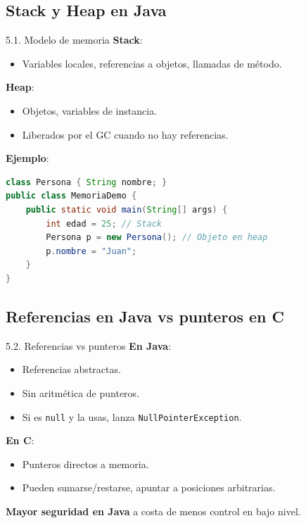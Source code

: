 \documentclass{beamer}
\begin{document}
\subsection{Stack y Heap en Java}

\begin{frame}[fragile]{5.1. Modelo de memoria}
\textbf{Stack}:
\begin{itemize}
  \item Variables locales, referencias a objetos, llamadas de método.
\end{itemize}

\textbf{Heap}:
\begin{itemize}
  \item Objetos, variables de instancia.
  \item Liberados por el GC cuando no hay referencias.
\end{itemize}

\textbf{Ejemplo}:
\begin{lstlisting}[language=Java]
class Persona { String nombre; }
public class MemoriaDemo {
    public static void main(String[] args) {
        int edad = 25; // Stack
        Persona p = new Persona(); // Objeto en heap
        p.nombre = "Juan";
    }
}
\end{lstlisting}
\end{frame}

\subsection{Referencias en Java vs punteros en C}

\begin{frame}{5.2. Referencias vs punteros}
\textbf{En Java}:
\begin{itemize}
  \item Referencias abstractas.
  \item Sin aritmética de punteros.
  \item Si es \texttt{null} y la usas, lanza \texttt{NullPointerException}.
\end{itemize}

\textbf{En C}:
\begin{itemize}
  \item Punteros directos a memoria.
  \item Pueden sumarse/restarse, apuntar a posiciones arbitrarias.
\end{itemize}

\textbf{Mayor seguridad en Java} a costa de menos control en bajo nivel.
\end{frame}
\end{document}
